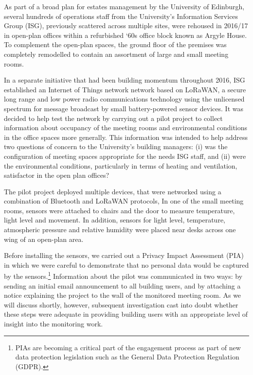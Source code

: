 As part of a broad plan for estates management by the University of Edinburgh, several hundreds of operations staff from the University’s Information Services Group (ISG), previously scattered across multiple sites, were rehoused in 2016/17 in open-plan offices within a refurbished ‘60s office block known as Argyle House. To complement the open-plan spaces, the ground floor of the premises was completely remodelled to contain an assortment of large and small meeting rooms. 

In a separate initiative that had been building momentum throughout 2016, ISG established an Internet of Things network network based on LoRaWAN, a secure long range and low power radio communications technology using the unlicensed spectrum for message broadcast by small battery-powered sensor devices. It was decided to help test the network by carrying out a pilot project to collect information about occupancy of the meeting rooms and environmental conditions in the office spaces more generally. This information was intended to help address two questions of concern to the University’s building managers: (i) was the configuration of meeting spaces appropriate for the needs ISG staff, and (ii) were the environmental conditions, particularly in terms of heating and ventilation, satisfactor in the open plan offices?

The pilot project deployed multiple devices, that were networked using a combination of Bluetooth and LoRaWAN protocols, In one of the small meeting rooms, sensors were attached to chairs and the door to measure temperature, light level and movement. In addition, sensors for light level, temperature, atmospheric pressure and relative humidity were placed near desks across one wing of an open-plan area.  

Before installing the sensors, we carried out a Privacy Impact Assessment (PIA) in which we were careful to demonstrate that no personal data would be captured by the sensors.\footnote{PIAs are becoming a critical part of the engagement process as part of new data protection legislation such as the General Data Protection Regulation (GDPR).} 
 Information about the pilot was communicated in two ways: by sending an initial email announcement to all building users, and by attaching a notice explaining the project to the wall of the monitored meeting room. As we will discuss shortly, however, subsequent investigation cast into doubt whether these steps were adequate in providing building users with an appropriate level of insight into the monitoring work. 

